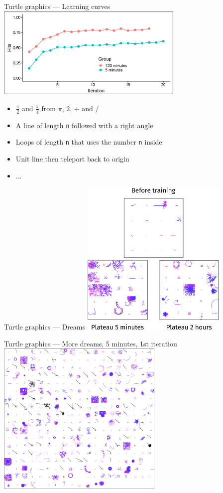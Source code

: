 \documentclass{beamer}
\begin{document}
\begin{frame}{Turtle graphics --- Learning curves}
  \centering
  \includegraphics[width=9cm]{figures/dreams/montageTalkLC.eps}
  \begin{itemize}
    \item $\frac\pi2$ and $\frac\pi4$ from $\pi$, $2$, $+$ and $/$
    \item A line of length \texttt{n} followed with a right angle
    \item Loops of length \texttt{n} that uses the number \texttt{n} inside.
    \item Unit line then teleport back to origin
    \item ...
  \end{itemize}
\end{frame}

\begin{frame}{Turtle graphics --- Dreams}
  \centering
  \includegraphics[width=7cm]{figures/dreams/montageTalkDreams.eps}
\end{frame}

\begin{frame}{Turtle graphics --- More dreams, 5 minutes, 1st iteration}
  \centering
  \includegraphics[width=8cm]{figures/dreams/5m_firstIteration.eps}
\end{frame}
\end{document}
